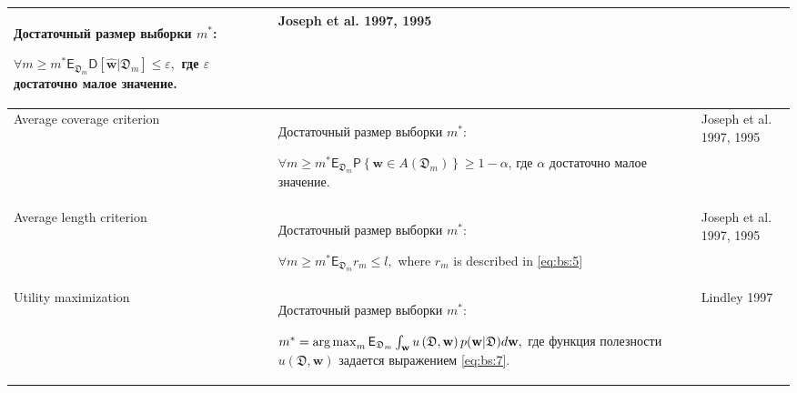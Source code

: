 \begin{table}
\begin{center}
{\begin{tabular}{|p{}|p{}|p{}|}
	Достаточный размер выборки $m^*$:
	
	$\forall m \geq m^*    \mathsf{E}_{\mathfrak{D}_m}\mathsf{D}\left[\hat{\textbf{w}}|\mathfrak{D}_m\right] \leq \varepsilon,$ где $\varepsilon$  достаточно малое значение.
	&Joseph et al. 1997, 1995\\
\hline
	Average coverage criterion&
	Достаточный размер выборки $m^*$:
	
	$\forall m \geq m^*    \mathsf{E}_{\mathfrak{D}_m}\mathsf{P}\left\{\textbf{w} \in A\left(\mathfrak{D}_m\right)\right\} \geq 1-\alpha$, где $\alpha$ достаточно малое значение.
	&Joseph et al. 1997, 1995\\
\hline
	Average length criterion&
	Достаточный размер выборки $m^*$:
	
	$\forall m \geq m^*    \mathsf{E}_{\mathfrak{D}_m}r_m\leq l,$ 
	where $r_m$ is described in \eqref{eq:bs:5}
	&Joseph et al. 1997, 1995\\
\hline
	Utility maximization&
	Достаточный размер выборки $m^*$:
	
	$m^* = \operatorname*{arg\,max}_{m} \mathsf{E}_{\mathfrak{D}_m}\int_{\textbf{w}}u\left(\mathfrak{D}, \textbf{w}\right)p(\textbf{w}|\mathfrak{D})d\textbf{w},$
	где функция полезности $u\left(\mathfrak{D}, \textbf{w}\right)$ задается выражением \eqref{eq:bs:7}.
	&Lindley 1997\\


\hline
\end{tabular}
}
\end{center}
\end{table}

